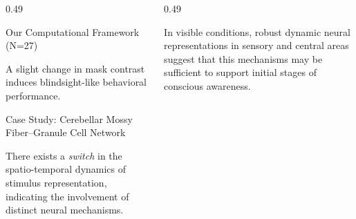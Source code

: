\documentclass{beamer}
\begin{document}
\begin{frame}
\begin{columns}
\begin{column}{0.49\linewidth}
            \begin{block}{\LARGE Our Computational Framework (N=27)}
            \centering
            \end{block}

            A slight change in mask contrast induces blindsight-like behavioral performance.

             \vspace{0.5cm}
            \begin{block}{\LARGE Case Study: Cerebellar Mossy Fiber–Granule Cell Network}
            \centering
            \vspace{1 cm}

\vspace{3 cm}

            \end{block}

        There exists a \emph{switch} in the spatio-temporal dynamics of stimulus representation, indicating the involvement of distinct neural mechanisms.  \\[0.3 cm]





        \end{column}

        \begin{column}{0.49\textwidth}
            \vspace{-0.5 cm}
            \centering

       \vspace{0.5 cm}

        \justifying
        In visible conditions, robust dynamic neural representations in sensory and central areas suggest that this mechanisms may be sufficient to support initial stages of conscious awareness.



\end{column}
\end{columns}
\end{frame}
\end{document}
